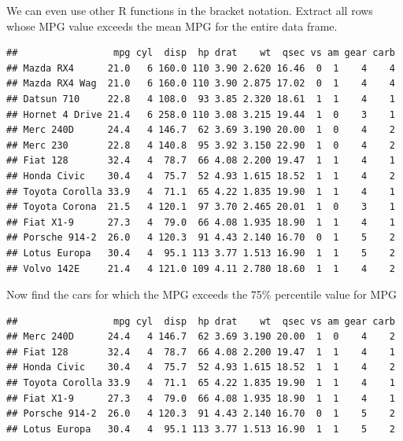 \documentclass[]{book}
\newenvironment{Shaded}{\begin{snugshade}}{\end{snugshade}}
\newcommand{\KeywordTok}[1]{\textcolor[rgb]{0.13,0.29,0.53}{\textbf{#1}}}
\newcommand{\DecValTok}[1]{\textcolor[rgb]{0.00,0.00,0.81}{#1}}
\newcommand{\StringTok}[1]{\textcolor[rgb]{0.31,0.60,0.02}{#1}}
\newcommand{\OperatorTok}[1]{\textcolor[rgb]{0.81,0.36,0.00}{\textbf{#1}}}
\newcommand{\NormalTok}[1]{#1}
\begin{document}
We can even use other R functions in the bracket notation. Extract all
rows whose MPG value exceeds the mean MPG for the entire data frame.

\begin{Shaded}
\end{Shaded}

\begin{verbatim}
##                 mpg cyl  disp  hp drat    wt  qsec vs am gear carb
## Mazda RX4      21.0   6 160.0 110 3.90 2.620 16.46  0  1    4    4
## Mazda RX4 Wag  21.0   6 160.0 110 3.90 2.875 17.02  0  1    4    4
## Datsun 710     22.8   4 108.0  93 3.85 2.320 18.61  1  1    4    1
## Hornet 4 Drive 21.4   6 258.0 110 3.08 3.215 19.44  1  0    3    1
## Merc 240D      24.4   4 146.7  62 3.69 3.190 20.00  1  0    4    2
## Merc 230       22.8   4 140.8  95 3.92 3.150 22.90  1  0    4    2
## Fiat 128       32.4   4  78.7  66 4.08 2.200 19.47  1  1    4    1
## Honda Civic    30.4   4  75.7  52 4.93 1.615 18.52  1  1    4    2
## Toyota Corolla 33.9   4  71.1  65 4.22 1.835 19.90  1  1    4    1
## Toyota Corona  21.5   4 120.1  97 3.70 2.465 20.01  1  0    3    1
## Fiat X1-9      27.3   4  79.0  66 4.08 1.935 18.90  1  1    4    1
## Porsche 914-2  26.0   4 120.3  91 4.43 2.140 16.70  0  1    5    2
## Lotus Europa   30.4   4  95.1 113 3.77 1.513 16.90  1  1    5    2
## Volvo 142E     21.4   4 121.0 109 4.11 2.780 18.60  1  1    4    2
\end{verbatim}

Now find the cars for which the MPG exceeds the 75\% percentile value
for MPG

\begin{Shaded}
\end{Shaded}

\begin{verbatim}
##                 mpg cyl  disp  hp drat    wt  qsec vs am gear carb
## Merc 240D      24.4   4 146.7  62 3.69 3.190 20.00  1  0    4    2
## Fiat 128       32.4   4  78.7  66 4.08 2.200 19.47  1  1    4    1
## Honda Civic    30.4   4  75.7  52 4.93 1.615 18.52  1  1    4    2
## Toyota Corolla 33.9   4  71.1  65 4.22 1.835 19.90  1  1    4    1
## Fiat X1-9      27.3   4  79.0  66 4.08 1.935 18.90  1  1    4    1
## Porsche 914-2  26.0   4 120.3  91 4.43 2.140 16.70  0  1    5    2
## Lotus Europa   30.4   4  95.1 113 3.77 1.513 16.90  1  1    5    2
\end{verbatim}
\end{document}
